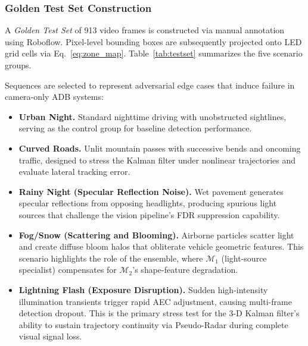 \documentclass[pdflatex,sn-mathphys-num]{sn-jnl}%
\theoremstyle{thmstyleone}%
\theoremstyle{thmstyletwo}%
\theoremstyle{thmstylethree}%
\begin{document}
\subsubsection{Golden Test Set Construction}
\label{subsec:testset}

A \emph{Golden Test Set} of 913 video frames is constructed via manual
annotation using Roboflow. Pixel-level bounding
boxes are subsequently projected onto LED grid cells via
Eq.~\eqref{eq:zone_map}. Table~\ref{tab:testset} summarizes the five
scenario groups.

Sequences are selected to represent adversarial edge cases that induce
failure in camera-only ADB systems:

\begin{itemize}
    \item \textbf{Urban Night.} Standard nighttime driving with
    unobstructed sightlines, serving as the control group for baseline
    detection performance.

    \item \textbf{Curved Roads.} Unlit mountain passes with successive
    bends and oncoming traffic, designed to stress the Kalman filter
    under nonlinear trajectories and evaluate lateral tracking error.

    \item \textbf{Rainy Night (Specular Reflection Noise).} Wet
    pavement generates specular reflections from opposing headlights,
    producing spurious light sources that challenge the vision pipeline's
    FDR suppression capability.

    \item \textbf{Fog/Snow (Scattering and Blooming).} Airborne
    particles scatter light and create diffuse bloom halos that
    obliterate vehicle geometric features. This scenario highlights the
    role of the ensemble, where $\mathcal{M}_1$ (light-source
    specialist) compensates for $\mathcal{M}_2$'s shape-feature
    degradation.

    \item \textbf{Lightning Flash (Exposure Disruption).} Sudden
    high-intensity illumination transients trigger rapid AEC adjustment,
    causing multi-frame detection dropout. This is the primary stress
    test for the 3-D Kalman filter's ability to sustain trajectory
    continuity via Pseudo-Radar during complete visual signal loss.
\end{itemize}
\end{document}
